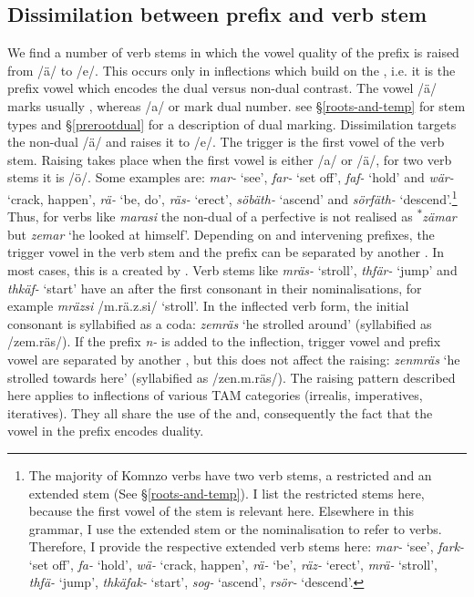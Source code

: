 \subsection{Dissimilation between prefix and verb stem} \label{vowelharmverbstem}

We find a number of verb stems in which the vowel quality of the prefix is raised from /ä/ to /e/. This occurs only in inflections which build on the , i.e. it is the prefix vowel which encodes the dual versus non-dual contrast. The vowel /ä/ marks usually , whereas /a/ or  mark dual number. see \S{}\ref{roots-and-temp} for stem types and \S{}\ref{prerootdual} for a description of dual marking. Dissimilation targets the non-dual /ä/ and raises it to /e/. The trigger is the first vowel of the verb stem. Raising takes place when the first vowel is either /a/ or /ä/, for two verb stems it is /ö/. Some examples are: \emph{mar-} `see', \emph{far-} `set off', \emph{faf-} `hold' and \emph{wär-} `crack, happen', \emph{rä-} `be, do', \emph{räs-} `erect', \emph{söbäth-} `ascend' and \emph{sörfäth-} `descend'.\footnote{The majority of Komnzo verbs have two verb stems, a restricted and an extended stem (See \S\ref{roots-and-temp}). I list the restricted stems here, because the first vowel of the stem is relevant here. Elsewhere in this grammar, I use the extended stem or the nominalisation to refer to verbs. Therefore, I provide the respective extended verb stems here: \emph{mar-} `see', \emph{fark-} `set off', \emph{fa-} `hold', \emph{wä-} `crack, happen', \emph{rä-} `be', \emph{räz-} `erect', \emph{mrä-} `stroll', \emph{thfä-} `jump', \emph{thkäfak-} `start', \emph{sog-} `ascend', \emph{rsör-} `descend'.} Thus, for verbs like \emph{marasi} the non-dual of a  perfective is not realised as \textsuperscript{$\ast$}\emph{zämar} but \emph{zemar} `he looked at himself'. Depending on  and intervening prefixes, the trigger vowel in the verb stem and the prefix can be separated by another . In most cases, this is a  created by . Verb stems like \emph{mräs-} `stroll', \emph{thfär-} `jump' and \emph{thkäf-} `start' have an  after the first consonant in their nominalisations, for example \emph{mräzsi} /m.rä.z.si/ `stroll'. In the inflected verb form, the initial consonant is syllabified as a coda: \emph{zemräs} `he strolled around' (syllabified as /zem.räs/). If the  prefix \emph{n-} is added to the inflection, trigger vowel and prefix vowel are separated by another , but this does not affect the raising: \emph{zenmräs} `he strolled towards here' (syllabified as /zen.m.räs/). The raising pattern described here applies to inflections of various TAM categories (irrealis, imperatives, iteratives). They all share the use of the  and, consequently the fact that the vowel in the prefix encodes duality.%


